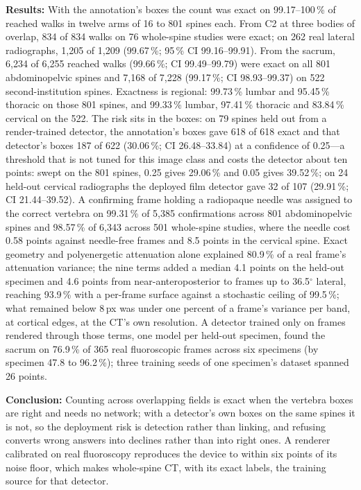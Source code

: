 \documentclass[11pt,letterpaper]{article}
\begin{document}
\noindent\textbf{Results:} With the annotation's boxes the count was exact on 99.17--100\,\% of reached
walks in twelve arms of 16 to 801 spines each. From C2 at three bodies of overlap, 834 of 834 walks on 76
whole-spine studies were exact; on 262 real lateral radiographs, 1{,}205 of 1{,}209 (99.67\,\%; 95\,\% CI
99.16--99.91). From the sacrum, 6{,}234 of 6{,}255 reached walks (99.66\,\%; CI 99.49--99.79) were exact on
all 801 abdominopelvic spines and 7{,}168 of 7{,}228 (99.17\,\%; CI 98.93--99.37) on 522 second-institution
spines. Exactness is regional: 99.73\,\% lumbar and 95.45\,\% thoracic on those 801 spines, and 99.33\,\%
lumbar, 97.41\,\% thoracic and 83.84\,\% cervical on the 522. The risk sits in the boxes: on 79 spines held
out from a render-trained detector, the annotation's boxes gave 618 of 618 exact and that detector's boxes
187 of 622 (30.06\,\%; CI 26.48--33.84) at a confidence of 0.25---a threshold that is not tuned for this
image class and costs the detector about ten points: swept on the 801 spines, 0.25 gives 29.06\,\% and
0.05 gives 39.52\,\%; on 24 held-out cervical radiographs the deployed film detector gave
32 of 107 (29.91\,\%; CI 21.44--39.52). A confirming frame holding a radiopaque needle was assigned to the
correct vertebra on 99.31\,\% of 5{,}385 confirmations across 801 abdominopelvic spines and 98.57\,\% of
6{,}343 across 501 whole-spine studies, where the needle cost 0.58 points against needle-free frames and
8.5 points in the cervical spine. Exact geometry and polyenergetic attenuation alone explained
80.9\,\% of a real frame's attenuation variance; the nine terms added a median 4.1 points on the held-out
specimen and 4.6 points from near-anteroposterior to frames up to 36.5$^\circ$ lateral, reaching
93.9\,\% with a per-frame surface against a stochastic ceiling of 99.5\,\%; what remained below 8\,px was
under one percent of a frame's variance per band, at cortical edges, at the CT's own resolution. A
detector trained only on frames rendered through those terms, one model per held-out specimen,
found the sacrum on 76.9\,\% of 365 real fluoroscopic frames across six specimens (by specimen 47.8 to
96.2\,\%); three training seeds of one specimen's dataset spanned 26 points.

\noindent\textbf{Conclusion:} Counting across overlapping fields is exact when the vertebra boxes are
right and needs no network; with a detector's own boxes on the same spines it is not, so the deployment
risk is detection rather than linking, and refusing converts wrong answers into declines rather than into
right ones. A renderer calibrated on real fluoroscopy reproduces the device to within six points of its
noise floor, which makes whole-spine CT, with its exact labels, the training source for that detector.
\end{document}
